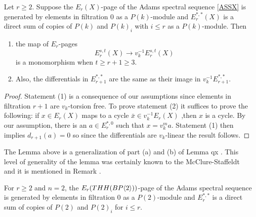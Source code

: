 \begin{lem}\label{mod p v_n}
Let $r\ge 2$. Suppose the $E_r(X)$-page of the Adams spectral sequence \eqref{ASSX} is generated by elements in filtration $0$ as a $P(k)$-module and $E_r^{*,*}(X)$ is a direct sum of copies of $P(k)$ and $P(k)_i$ with $i\le r$ as a $P(k)$-module. Then
\begin{enumerate}
\item{} the map of $E_r$-pages
\[ E_r^{s,t}(X) \to v_k^{-1}E_r^{s,t}(X) \]
is a monomorphism when $t\ge r+1\ge 3$. 
\item{} Also, the differentials in $E_{r+1}^{*,*}$ are the same as their image in $v_k^{-1}E_{r+1}^{*,*}$. 
\end{enumerate}
\end{lem}
\begin{proof}
Statement (1) is a consequence of our assumptions since elements in filtration $r+1$ are $v_k$-torsion free. 
To prove statement (2) it suffices to prove the following: if $x\in E_r(X)$ maps to a cycle $\bar{x}\in v_k^{-1}E_r(X)$ ,then $x$ is a cycle. By our assumption, there is an $a\in E_r^{*,0}$ such that $x=v_k^ma$. Statement (1) then implies $d_{r+1}(a)=0$ so since the differentials are $v_k$-linear the result follows. 
\end{proof}
\begin{rem}
The Lemma above is a generalization of part (a) and (b) of Lemma qx \cite{qx}. This level of generality of the lemma was certainly known to the McClure-Staffeldt and it is mentioned in Remark \cite{qx}. 
\end{rem}
\begin{lem} \label{lem mod p v_1}
For $r\ge 2$ and $n=2$, the $E_r(THH(BP\langle 2 \rangle))$-page of the Adams spectral sequence is generated by elements in filtration $0$ as a $P(2)$-module and $E_{r}^{*,*}$ is a direct sum of copies of $P(2)$ and $P(2)_i$ for $i\le r$. 
\end{lem}

